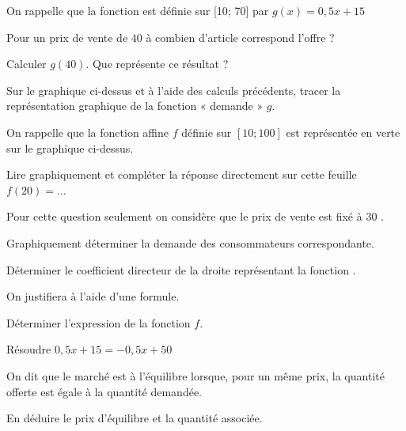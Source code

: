 \documentclass[11pt,a4paper]{article}  %
\begin{document}
\begin{enumMet}
	\item On rappelle que la fonction  est définie sur [10; 70] par $g(x)=0,5x+15$
	\begin{enumMet}
		\item Pour un prix de vente de $40$ \EUR{} à combien d'article correspond l'offre ?
		\item Calculer $g(40)$. Que représente ce résultat ?
		\item Sur le graphique ci-dessus et à l'aide des calculs précédents, tracer la représentation graphique de la fonction « demande » $g$.
	\end{enumMet}
	\item On rappelle que la fonction affine  $f$ définie sur $[10 ; 100]$ est représentée en verte sur le graphique ci-dessus.
	\begin{enumMet}
		\item Lire graphiquement et compléter la réponse directement sur cette feuille $f(20)=\ldots$
		\item Pour cette question seulement on considère que le prix de vente est fixé à $30$ \EUR{}.
		
		Graphiquement déterminer la demande des consommateurs correspondante.
		\item Déterminer le coefficient directeur de la droite représentant la fonction \guillemets{demande}.
		
		On justifiera à l'aide d'une formule.
		\item Déterminer l'expression de la fonction $f$.
	\end{enumMet}
	\item \begin{enumMet}
		\item Résoudre $0,5x+15=-0,5 x+50$
		\item On dit que le marché est à l'équilibre lorsque, pour un même prix, la quantité offerte est égale à la quantité demandée.
		
		En déduire le prix d'équilibre et la quantité associée.
	\end{enumMet}
	
\end{enumMet}
\end{document}
